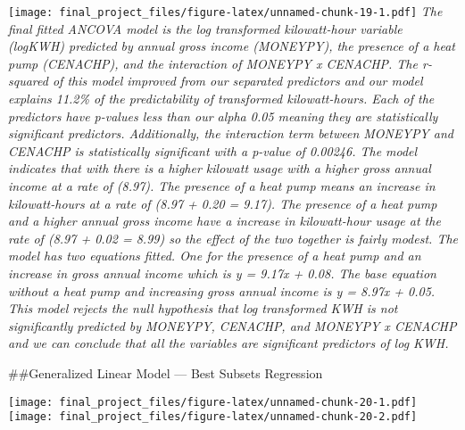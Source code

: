 \documentclass[
]{article}
\newenvironment{Shaded}{\begin{snugshade}}{\end{snugshade}}
\newcommand{\FunctionTok}[1]{\textcolor[rgb]{0.00,0.00,0.00}{#1}}
\newcommand{\NormalTok}[1]{#1}
\newcommand{\OtherTok}[1]{\textcolor[rgb]{0.56,0.35,0.01}{#1}}
\newcommand{\SpecialCharTok}[1]{\textcolor[rgb]{0.00,0.00,0.00}{#1}}
\begin{document}
\texttt{[image: final\_project\_files/figure-latex/unnamed-chunk-19-1.pdf]}
\emph{The final fitted ANCOVA model is the log transformed kilowatt-hour
variable (logKWH) predicted by annual gross income (MONEYPY), the
presence of a heat pump (CENACHP), and the interaction of MONEYPY x
CENACHP. The r-squared of this model improved from our separated
predictors and our model explains 11.2\% of the predictability of
transformed kilowatt-hours. Each of the predictors have p-values less
than our alpha 0.05 meaning they are statistically significant
predictors. Additionally, the interaction term between MONEYPY and
CENACHP is statistically significant with a p-value of 0.00246. The
model indicates that with there is a higher kilowatt usage with a higher
gross annual income at a rate of (8.97). The presence of a heat pump
means an increase in kilowatt-hours at a rate of (8.97 + 0.20 = 9.17).
The presence of a heat pump and a higher annual gross income have a
increase in kilowatt-hour usage at the rate of (8.97 + 0.02 = 8.99) so
the effect of the two together is fairly modest. The model has two
equations fitted. One for the presence of a heat pump and an increase in
gross annual income which is y = 9.17x + 0.08. The base equation without
a heat pump and increasing gross annual income is y = 8.97x + 0.05. This
model rejects the null hypothesis that log transformed KWH is not
significantly predicted by MONEYPY, CENACHP, and MONEYPY x CENACHP and
we can conclude that all the variables are significant predictors of log
KWH.}

\#\#Generalized Linear Model --- Best Subsets Regression

\begin{Shaded}
\end{Shaded}

\texttt{[image: final\_project\_files/figure-latex/unnamed-chunk-20-1.pdf]}
\texttt{[image: final\_project\_files/figure-latex/unnamed-chunk-20-2.pdf]}

\begin{Shaded}
\end{Shaded}
\end{document}
